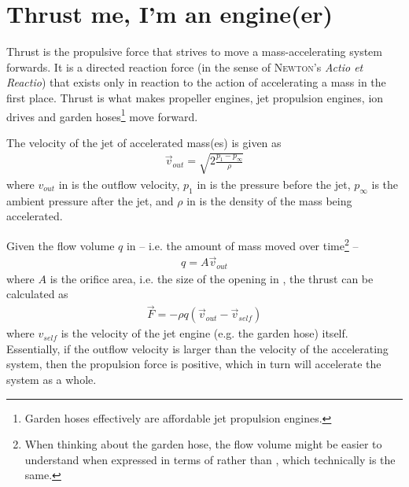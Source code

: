 
\section{Thrust me, I'm an engine(er)}

Thrust is the propulsive force that strives to move a mass-accelerating system forwards. 
It is a directed reaction force (in the sense of \textsc{Newton}'s \textit{Actio et Reactio})
that exists only in reaction to the action of accelerating a mass in the first place.
Thrust is what makes propeller engines, jet propulsion engines, ion drives and garden 
hoses\footnote{Garden hoses effectively are affordable jet propulsion engines.} move forward.


The velocity of the jet of accelerated mass(es) is given as
%
\begin{align}
\vec{v}_{out} = \sqrt{2\frac{p_1 - p_\infty}{\rho}} \label{eq:outflow_velocity}
\end{align}
%
where $v_{out}$ in \withunit{\metre\per\second} is the outflow velocity,
$p_1$ in \withunit{\newton\per\square\metre} is the pressure before the jet,
$p_\infty$ is the ambient pressure after the jet, and
$\rho$ in \withunit{\kilo\gram\per\cubic\metre} is the density of the mass being accelerated.

Given the flow volume $q$ in \withunit{\cubic\metre\per\second} -- i.e. the amount
of mass moved over time\footnote{When
thinking about the garden hose, the flow volume might be easier to understand when expressed in terms of  rather than , which technically is the same.} --
%
\begin{align}
q = A\vec{v}_{out} \label{eq:flowvolume}
\end{align}
%
where $A$ is the orifice area, i.e. the size of the opening in \withunit{\square\metre}, the thrust can be calculated as
%
\begin{align}
\vec{F} = -\rho q \left( \vec{v}_{out} - \vec{v}_{self} \right) \label{eq:thrust}
\end{align}
%
where $v_{self}$ is the velocity of the jet engine (e.g. the garden hose) itself. Essentially, if the outflow velocity is larger than the velocity
of the accelerating system, then the propulsion force is positive, which in
turn will accelerate the system as a whole.

